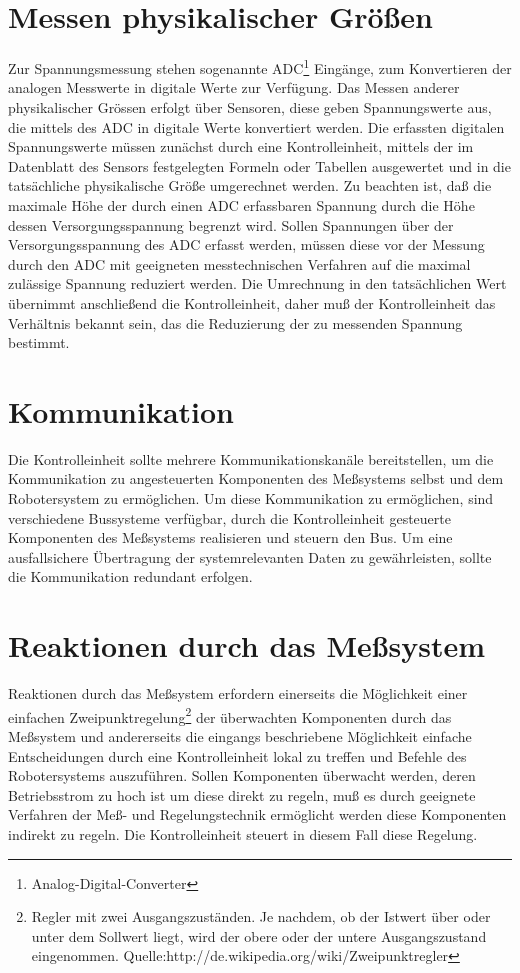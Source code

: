 \documentclass[
	11pt,								%
	a4paper,						%
	oneside,						%
	titlepage,					%
	headsepline,				%
	DIV13,							%
	abstracton,	 				%
	BCOR0cm,						%
	bibliography=totoc, %
]{scrreprt}							%
\begin{document}
  \section{ Messen physikalischer Größen}
  Zur Spannungsmessung stehen sogenannte ADC\footnote{Analog-Digital-Converter} Eingänge, zum Konvertieren der analogen Messwerte in digitale Werte zur Verfügung.
  Das Messen anderer physikalischer Grössen erfolgt über Sensoren, diese geben Spannungswerte aus, die mittels des ADC in digitale Werte konvertiert werden. 
  Die erfassten digitalen Spannungswerte müssen zunächst durch eine Kontrolleinheit, mittels der im Datenblatt des Sensors festgelegten Formeln oder Tabellen ausgewertet und in die tatsächliche
  physikalische Größe umgerechnet werden. Zu beachten ist, daß die maximale Höhe der durch einen ADC erfassbaren Spannung durch die Höhe dessen Versorgungsspannung begrenzt wird. Sollen Spannungen 
  über der Versorgungsspannung des ADC erfasst werden, müssen diese vor der Messung durch den ADC mit geeigneten messtechnischen Verfahren auf die maximal zulässige Spannung reduziert werden. Die Umrechnung in den
  tatsächlichen Wert übernimmt anschließend die Kontrolleinheit, daher muß der Kontrolleinheit das Verhältnis bekannt sein, das die Reduzierung der zu messenden Spannung bestimmt. 

  \section{ Kommunikation}
  Die Kontrolleinheit sollte mehrere Kommunikationskanäle bereitstellen, um die Kommunikation zu angesteuerten Komponenten des Meßsystems selbst und dem Robotersystem zu ermöglichen.
  Um diese Kommunikation zu ermöglichen, sind verschiedene Bussysteme verfügbar, durch die Kontrolleinheit gesteuerte Komponenten des Meßsystems
  realisieren und steuern den Bus. Um eine ausfallsichere Übertragung der systemrelevanten Daten zu gewährleisten, sollte die Kommunikation redundant erfolgen.
  
  \section{ Reaktionen durch das Meßsystem}
  Reaktionen durch das Meßsystem erfordern einerseits die Möglichkeit einer einfachen Zweipunktregelung\footnote{Regler mit zwei Ausgangszuständen. Je nachdem, ob der Istwert über oder unter dem Sollwert liegt, wird der obere oder der untere Ausgangszustand eingenommen. Quelle:http://de.wikipedia.org/wiki/Zweipunktregler} der überwachten Komponenten durch das Meßsystem und andererseits die eingangs beschriebene
  Möglichkeit einfache Entscheidungen durch eine Kontrolleinheit lokal zu treffen und Befehle des Robotersystems auszuführen. Sollen Komponenten überwacht werden, deren Betriebsstrom zu hoch ist um diese direkt zu regeln,
  muß es durch geeignete Verfahren der Meß- und Regelungstechnik ermöglicht werden diese Komponenten indirekt zu regeln. Die Kontrolleinheit steuert in diesem Fall diese Regelung.
\end{document}
